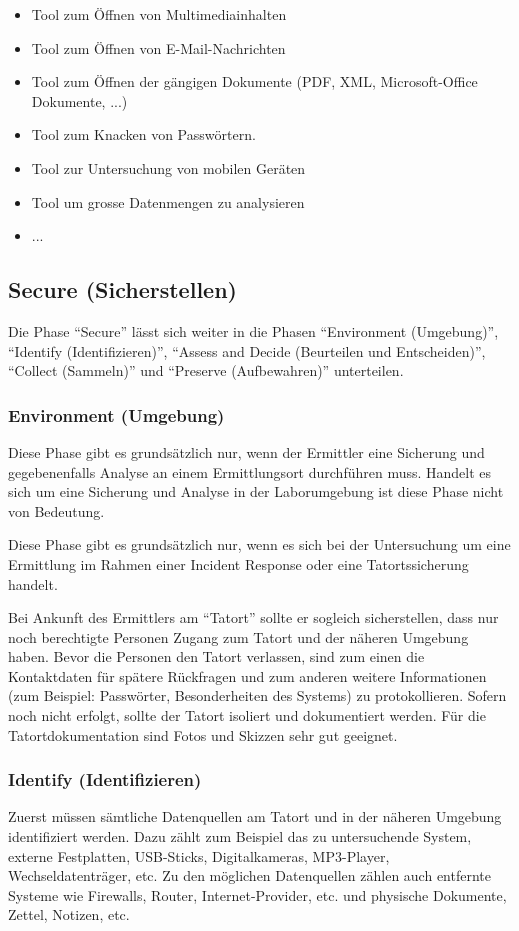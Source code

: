 \begin{itemize}
\begin{itemize}
\item Tool zum Öffnen von Multimediainhalten
\item Tool zum Öffnen von E-Mail-Nachrichten
\item Tool zum Öffnen der gängigen Dokumente (PDF, XML, Microsoft-Office Dokumente, ...)
\item Tool zum Knacken von Passwörtern.
\item Tool zur Untersuchung von mobilen Geräten
\item Tool um grosse Datenmengen zu analysieren
\item ...
\end{itemize}
\end{itemize}

\subsection{Secure (Sicherstellen)}
Die Phase "`Secure"' lässt sich weiter in die Phasen "`Environment (Umgebung)"', "`Identify (Identifizieren)"', "`Assess and Decide (Beurteilen und Entscheiden)"', "`Collect (Sammeln)"' und "`Preserve (Aufbewahren)"' unterteilen.


\subsubsection{Environment (Umgebung)}
Diese Phase gibt es grundsätzlich nur, wenn der Ermittler eine Sicherung und gegebenenfalls Analyse an einem Ermittlungsort durchführen muss. Handelt es sich um eine Sicherung und Analyse in der Laborumgebung ist diese Phase nicht von Bedeutung.

Diese Phase gibt es grundsätzlich nur, wenn es sich bei der Untersuchung um eine Ermittlung im Rahmen einer Incident Response oder eine Tatortssicherung handelt.

Bei Ankunft des Ermittlers am "`Tatort"' sollte er sogleich sicherstellen, dass nur noch berechtigte Personen Zugang zum Tatort und der näheren Umgebung haben. Bevor die Personen den Tatort verlassen, sind zum einen die Kontaktdaten für spätere Rückfragen und zum anderen weitere Informationen (zum Beispiel: Passwörter, Besonderheiten des Systems) zu protokollieren. Sofern noch nicht erfolgt, sollte der Tatort isoliert und dokumentiert werden. Für die Tatortdokumentation sind Fotos und Skizzen sehr gut geeignet.

\subsubsection{Identify (Identifizieren)}
Zuerst müssen sämtliche Datenquellen am Tatort und in der näheren Umgebung identifiziert werden. Dazu zählt zum Beispiel das zu untersuchende System, externe Festplatten, USB-Sticks, Digitalkameras, MP3-Player, Wechseldatenträger, etc. Zu den möglichen Datenquellen zählen auch entfernte Systeme wie Firewalls, Router, Internet-Provider, etc. und physische Dokumente, Zettel, Notizen, etc. 


